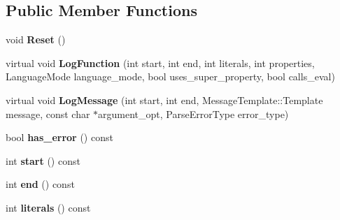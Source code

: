 \subsection*{Public Member Functions}
\begin{DoxyCompactItemize}
\item 
void {\bfseries Reset} ()\hypertarget{classv8_1_1internal_1_1_singleton_logger_afcf71cbf0471db7bc5eaa93613428df8}{}\label{classv8_1_1internal_1_1_singleton_logger_afcf71cbf0471db7bc5eaa93613428df8}

\item 
virtual void {\bfseries Log\+Function} (int start, int end, int literals, int properties, Language\+Mode language\+\_\+mode, bool uses\+\_\+super\+\_\+property, bool calls\+\_\+eval)\hypertarget{classv8_1_1internal_1_1_singleton_logger_a7353856484876950101be92078a06a20}{}\label{classv8_1_1internal_1_1_singleton_logger_a7353856484876950101be92078a06a20}

\item 
virtual void {\bfseries Log\+Message} (int start, int end, Message\+Template\+::\+Template message, const char $\ast$argument\+\_\+opt, Parse\+Error\+Type error\+\_\+type)\hypertarget{classv8_1_1internal_1_1_singleton_logger_a2dfb55cfbe8115a67a1b6a811ffb7185}{}\label{classv8_1_1internal_1_1_singleton_logger_a2dfb55cfbe8115a67a1b6a811ffb7185}

\item 
bool {\bfseries has\+\_\+error} () const \hypertarget{classv8_1_1internal_1_1_singleton_logger_a5dd3460d65eb773c7b0279c037846e9c}{}\label{classv8_1_1internal_1_1_singleton_logger_a5dd3460d65eb773c7b0279c037846e9c}

\item 
int {\bfseries start} () const \hypertarget{classv8_1_1internal_1_1_singleton_logger_ab59ea14aefe4a6c07b4243d281bc83b9}{}\label{classv8_1_1internal_1_1_singleton_logger_ab59ea14aefe4a6c07b4243d281bc83b9}

\item 
int {\bfseries end} () const \hypertarget{classv8_1_1internal_1_1_singleton_logger_a249cf182d6f57396ddc4be81eb678b27}{}\label{classv8_1_1internal_1_1_singleton_logger_a249cf182d6f57396ddc4be81eb678b27}

\item 
int {\bfseries literals} () const \hypertarget{classv8_1_1internal_1_1_singleton_logger_a6c0671ed2f7be19d9c9f393a1d31316e}{}\label{classv8_1_1internal_1_1_singleton_logger_a6c0671ed2f7be19d9c9f393a1d31316e}


\end{DoxyCompactItemize}
